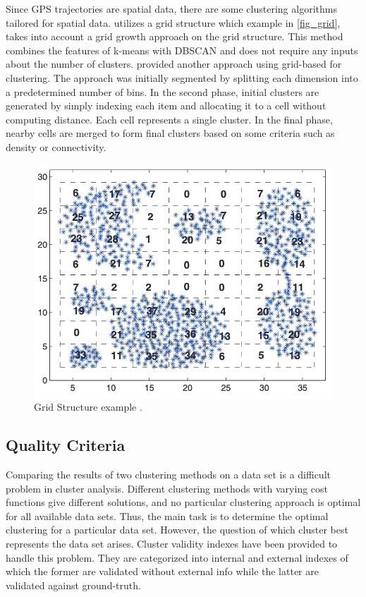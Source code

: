 \documentclass[a4paper, 12pt]{article}
\begin{document}
Since GPS trajectories are spatial data, there are some clustering algorithms tailored for spatial data. \citet{zhao2015grid} utilizes a grid structure which example in \autoref{fig_grid}, takes into account a grid growth approach on the grid structure. This method combines the features of k-means with DBSCAN and does not require any inputs about the number of clusters. \citet{rezaei2018real} provided another approach using grid-based for clustering. The approach was initially segmented by splitting each dimension into a predetermined number of bins. In the second phase, initial clusters are generated by simply indexing each item and allocating it to a cell without computing distance. Each cell represents a single cluster. In the final phase, nearby cells are merged to form final clusters based on some criteria such as density or connectivity.

\begin{figure}[htbp!]
    \centering
    \includegraphics[width=1\textwidth]{grid_structure.png}
    \caption{Grid Structure example \citep{zhao2015grid}.}
    \label{fig_grid}
\end{figure}

\subsection{Quality Criteria}

Comparing the results of two clustering methods on a data set is a difficult problem in cluster analysis. Different clustering methods with varying cost functions give different solutions, and no particular clustering approach is optimal for all available data sets. Thus, the main task is to determine the optimal clustering for a particular data set. However, the question of which cluster best represents the data set arises. Cluster validity indexes have been provided to handle this problem. They are categorized into internal and external indexes of which the former are validated without external info while the latter are validated against ground-truth.
\end{document}
